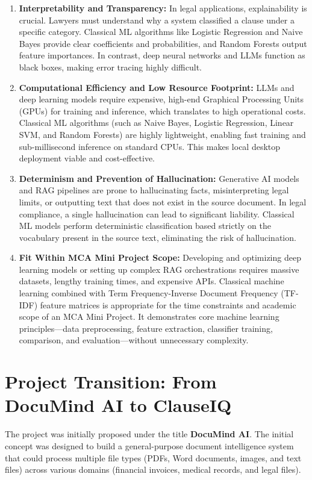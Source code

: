 \documentclass[12pt, a4paper]{report}
\begin{document}
\begin{enumerate}
    \item \textbf{Interpretability and Transparency:} In legal applications, explainability is crucial. Lawyers must understand why a system classified a clause under a specific category. Classical ML algorithms like Logistic Regression and Naive Bayes provide clear coefficients and probabilities, and Random Forests output feature importances. In contrast, deep neural networks and LLMs function as black boxes, making error tracing highly difficult.
    \item \textbf{Computational Efficiency and Low Resource Footprint:} LLMs and deep learning models require expensive, high-end Graphical Processing Units (GPUs) for training and inference, which translates to high operational costs. Classical ML algorithms (such as Naive Bayes, Logistic Regression, Linear SVM, and Random Forests) are highly lightweight, enabling fast training and sub-millisecond inference on standard CPUs. This makes local desktop deployment viable and cost-effective.
    \item \textbf{Determinism and Prevention of Hallucination:} Generative AI models and RAG pipelines are prone to hallucinating facts, misinterpreting legal limits, or outputting text that does not exist in the source document. In legal compliance, a single hallucination can lead to significant liability. Classical ML models perform deterministic classification based strictly on the vocabulary present in the source text, eliminating the risk of hallucination.
    \item \textbf{Fit Within MCA Mini Project Scope:} Developing and optimizing deep learning models or setting up complex RAG orchestrations requires massive datasets, lengthy training times, and expensive APIs. Classical machine learning combined with Term Frequency-Inverse Document Frequency (TF-IDF) feature matrices is appropriate for the time constraints and academic scope of an MCA Mini Project. It demonstrates core machine learning principles—data preprocessing, feature extraction, classifier training, comparison, and evaluation—without unnecessary complexity.
\end{enumerate}

\section{Project Transition: From DocuMind AI to ClauseIQ}
The project was initially proposed under the title \textbf{DocuMind AI}. The initial concept was designed to build a general-purpose document intelligence system that could process multiple file types (PDFs, Word documents, images, and text files) across various domains (financial invoices, medical records, and legal files). 
\end{document}
